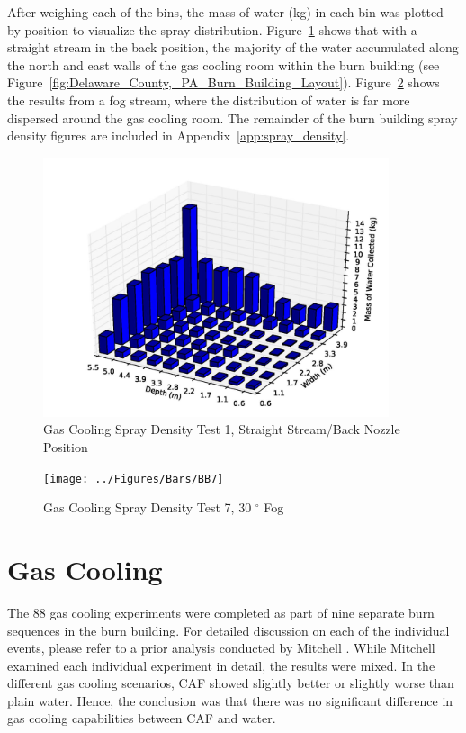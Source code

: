 \documentclass[12pt,oneside]{book}
\begin{document}
After weighing each of the bins, the mass of water (kg) in each bin was plotted by position to visualize the spray distribution. Figure~\ref{fig:Burn_Building_Test_1} shows that with a straight stream in the back position, the majority of the water accumulated along the north and east walls of the gas cooling room within the burn building (see Figure~\ref{fig:Delaware_County,_PA_Burn_Building_Layout}). Figure~\ref{fig:Burn_Building_Test_7} shows the results from a fog stream, where the distribution of water is far more dispersed around the gas cooling room. The remainder of the burn building spray density figures are included in Appendix~\ref{app:spray_density}.

\begin{figure}[!ht]
	\includegraphics[width=4in]{../Figures/Bars/BB1}
	\caption{Gas Cooling Spray Density Test 1, Straight Stream/Back Nozzle Position}
	\label{fig:Burn_Building_Test_1}
\end{figure}

\begin{figure}[!ht]
	\texttt{[image: ../Figures/Bars/BB7]}
	\caption{Gas Cooling Spray Density Test 7, 30 $^{\circ}$ Fog} 
	\label{fig:Burn_Building_Test_7}
\end{figure}


\clearpage

\section{Gas Cooling}
\label{sec:Gas_Cooling}

The 88 gas cooling experiments were completed as part of nine separate burn sequences in the burn building. For detailed discussion on each of the individual events, please refer to a prior analysis conducted by Mitchell \cite{Mitchell:1}. While Mitchell examined each individual experiment in detail, the results were mixed.  In the different gas cooling scenarios, CAF showed slightly better or slightly worse than plain water.  Hence, the conclusion was that there was no significant difference in gas cooling capabilities between CAF and water.  
\end{document}
